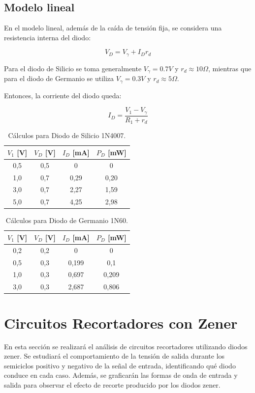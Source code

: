 \subsection{Modelo lineal}

En el modelo lineal, además de la caída de tensión fija, se considera una resistencia interna del diodo:

\[
V_D = V_{\gamma} + I_D r_d
\]

Para el diodo de Silicio se toma generalmente $V_{\gamma}=0.7V$ y $r_d \approx 10\Omega$, mientras que para el diodo de Germanio se utiliza $V_{\gamma}=0.3V$ y $r_d \approx 5\Omega$.

Entonces, la corriente del diodo queda:

\[
I_D = \frac{V_1 - V_{\gamma}}{R_1 + r_d}
\]
\begin{table}[H]
\centering
\caption{Cálculos para Diodo de Silicio 1N4007.}
\begin{tabular}{c c c c}
\hline
$V_1$ [V] & $V_D$ [V] & $I_D$ [mA] & $P_D$ [mW] \\
\hline
0,5 &0,5 &0&0 \\
1,0 &0,7 &0,29 &0,20 \\
3,0 &0,7 &2,27&1,59 \\
5,0 &0,7 &4,25&2,98 \\
\hline
\end{tabular}
\end{table}

\vspace{0.5cm}

\begin{table}[H]
\centering
\caption{Cálculos para Diodo de Germanio 1N60.}
\begin{tabular}{c c c c}
\hline
$V_1$ [V] & $V_D$ [V] & $I_D$ [mA] & $P_D$ [mW] \\
\hline
0,2 &0,2 &0 &0 \\
0,5 &0,3 &0,199 &0,1 \\
1,0 &0,3 &0,697 &0,209 \\
3,0 &0,3 &2,687 &0,806 \\
\hline
\end{tabular}
\end{table}


\section{Circuitos Recortadores con Zener}

En esta sección se realizará el análisis de circuitos recortadores utilizando diodos zener. Se estudiará el comportamiento de la tensión de salida durante los semiciclos positivo y negativo de la señal de entrada, 
identificando qué diodo conduce en cada caso. Además, se graficarán las formas de onda de entrada y salida para observar el efecto de recorte producido por los diodos zener.

